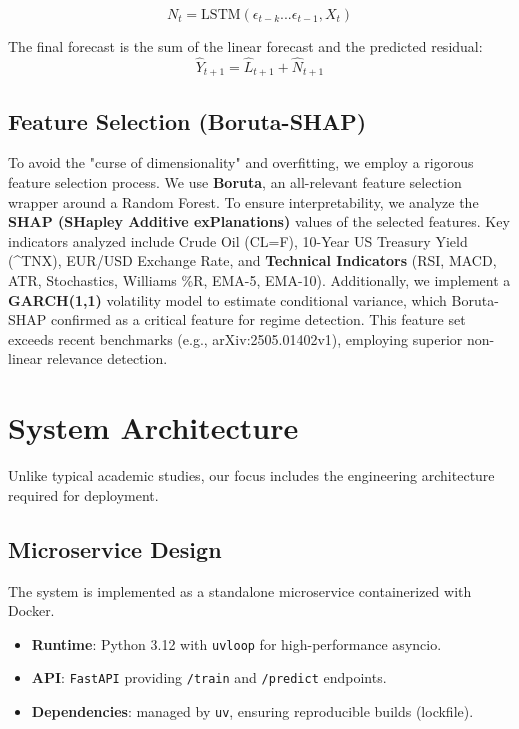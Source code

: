 \documentclass[11pt, a4paper]{article}
\begin{document}
\begin{equation}
N_t = \text{LSTM}(\epsilon_{t-k}... \epsilon_{t-1}, X_t)
\end{equation}

The final forecast is the sum of the linear forecast and the predicted residual:
\begin{equation}
\hat{Y}_{t+1} = \hat{L}_{t+1} + \hat{N}_{t+1}
\end{equation}

\subsection{Feature Selection (Boruta-SHAP)}
To avoid the "curse of dimensionality" and overfitting, we employ a rigorous feature selection process. We use \textbf{Boruta}, an all-relevant feature selection wrapper around a Random Forest. To ensure interpretability, we analyze the \textbf{SHAP (SHapley Additive exPlanations)} values of the selected features.
Key indicators analyzed include Crude Oil (CL=F), 10-Year US Treasury Yield (\^{}TNX), EUR/USD Exchange Rate, and \textbf{Technical Indicators} (RSI, MACD, ATR, Stochastics, Williams \%R, EMA-5, EMA-10). Additionally, we implement a \textbf{GARCH(1,1)} volatility model to estimate conditional variance, which Boruta-SHAP confirmed as a critical feature for regime detection. This feature set exceeds recent benchmarks (e.g., arXiv:2505.01402v1), employing superior non-linear relevance detection.

\section{System Architecture}
Unlike typical academic studies, our focus includes the engineering architecture required for deployment.

\subsection{Microservice Design}
The system is implemented as a standalone microservice containerized with Docker.
\begin{itemize}
    \item \textbf{Runtime}: Python 3.12 with \texttt{uvloop} for high-performance asyncio.
    \item \textbf{API}: \texttt{FastAPI} providing \texttt{/train} and \texttt{/predict} endpoints.
    \item \textbf{Dependencies}: managed by \texttt{uv}, ensuring reproducible builds (lockfile).
\end{itemize}
\end{document}
